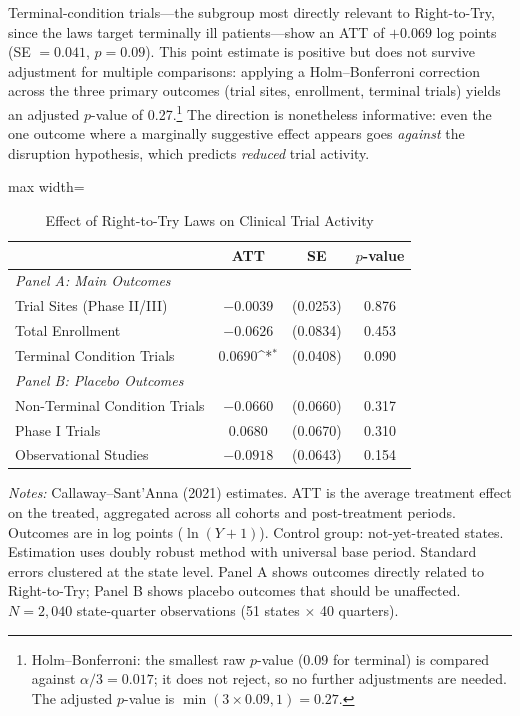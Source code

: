 \documentclass[12pt]{article}
\newcommand{\sym}[1]{\ifmmode^{#1}\else\(^{#1}\)\fi}
\begin{document}
Terminal-condition trials---the subgroup most directly relevant to Right-to-Try, since the laws target terminally ill patients---show an ATT of $+0.069$ log points (SE $= 0.041$, $p = 0.09$). This point estimate is positive but does not survive adjustment for multiple comparisons: applying a Holm--Bonferroni correction across the three primary outcomes (trial sites, enrollment, terminal trials) yields an adjusted $p$-value of 0.27.\footnote{Holm--Bonferroni: the smallest raw $p$-value (0.09 for terminal) is compared against $\alpha / 3 = 0.017$; it does not reject, so no further adjustments are needed. The adjusted $p$-value is $\min(3 \times 0.09, 1) = 0.27$.} The direction is nonetheless informative: even the one outcome where a marginally suggestive effect appears goes \textit{against} the disruption hypothesis, which predicts \textit{reduced} trial activity.

\begin{table}[H]
\centering
\caption{Effect of Right-to-Try Laws on Clinical Trial Activity}
\label{tab:main}
\begin{adjustbox}{max width=\textwidth}
\begin{tabular}{lccc}
\toprule
 & ATT & SE & $p$-value \\
\midrule
\multicolumn{4}{l}{\textit{Panel A: Main Outcomes}} \\
Trial Sites (Phase II/III) & $-0.0039$ & (0.0253) & 0.876 \\
Total Enrollment & $-0.0626$ & (0.0834) & 0.453 \\
Terminal Condition Trials & 0.0690\sym{*} & (0.0408) & 0.090 \\
\midrule
\multicolumn{4}{l}{\textit{Panel B: Placebo Outcomes}} \\
Non-Terminal Condition Trials & $-0.0660$ & (0.0660) & 0.317 \\
Phase I Trials & 0.0680 & (0.0670) & 0.310 \\
Observational Studies & $-0.0918$ & (0.0643) & 0.154 \\
\bottomrule
\end{tabular}
\end{adjustbox}
\begin{minipage}{0.95\textwidth}
\vspace{0.3em}
\footnotesize \textit{Notes:} Callaway--Sant'Anna (2021) estimates. ATT is the average treatment effect on the treated, aggregated across all cohorts and post-treatment periods. Outcomes are in log points ($\ln(Y+1)$). Control group: not-yet-treated states. Estimation uses doubly robust method with universal base period. Standard errors clustered at the state level. Panel A shows outcomes directly related to Right-to-Try; Panel B shows placebo outcomes that should be unaffected. $N = 2{,}040$ state-quarter observations (51 states $\times$ 40 quarters).
\end{minipage}
\end{table}
\end{document}
